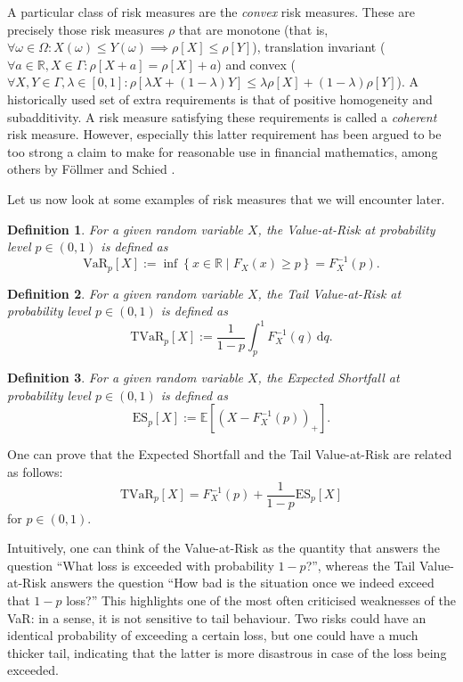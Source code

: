 \documentclass{article}
\newtheorem{definition}{Definition}
\begin{document}
A particular class of risk measures are the \textit{convex} risk measures. These are precisely those risk measures $\rho$ that are monotone (that is, $\forall \omega \in \Omega: X(\omega) \leq Y(\omega) \implies \rho[X] \leq \rho[Y]$), translation invariant ($\forall a \in \mathbb{R}, X \in \Gamma: \rho[X + a] = \rho[X] + a$) and convex ($\forall X, Y \in \Gamma, \lambda \in [0, 1]: \rho[\lambda X + (1-\lambda) Y] \leq \lambda \rho[X] + (1-\lambda)\rho[Y]$). A historically used set of extra requirements is that of positive homogeneity and subadditivity. A risk measure satisfying these requirements is called a \textit{coherent} risk measure. However, especially this latter requirement has been argued to be too strong a claim to make for reasonable use in financial mathematics, among others by Föllmer and Schied \cite{Follmer2002}. 

Let us now look at some examples of risk measures that we will encounter later.
\\
\begin{definition}\cite[Definition 6.3.1]{Risk_Measurement}
    For a given random variable $X$, the \textit{Value-at-Risk} at probability level $p \in (0, 1)$ is defined as $$\text{VaR}_p[X] := \inf \left\{x \in \mathbb{R} \mid F_X(x) \geq p \right\} = F_X^{-1} (p).$$
\end{definition}

\begin{definition}\cite[Definition 6.3.2]{Risk_Measurement}
    For a given random variable $X$, the \textit{Tail Value-at-Risk} at probability level $p \in (0, 1)$ is defined as $$\text{TVaR}_p[X] := \frac{1}{1 - p} \int_p^1  F_X^{-1} (q) \, \textrm{d}q.$$
\end{definition}

\begin{definition}\cite[Definition 6.3.4]{Risk_Measurement}
    For a given random variable $X$, the \textit{Expected Shortfall} at probability level $p \in (0, 1)$ is defined as $$\text{ES}_p[X] := \mathbb{E} \! \left[(X - F_X^{-1}(p))_+\right].$$
\end{definition}

One can prove that the Expected Shortfall and the Tail Value-at-Risk are related as follows:
$$\text{TVaR}_p[X] = F_X^{-1}(p) + \frac{1}{1-p}\text{ES}_p[X]$$
for $p\in (0,1)$.

Intuitively, one can think of the Value-at-Risk as the quantity that answers the question ``What loss is exceeded with probability $1 - p$?'', whereas the Tail Value-at-Risk answers the question ``How bad is the situation once we indeed exceed that $1-p$ loss?'' This highlights one of the most often criticised weaknesses of the VaR: in a sense, it is not sensitive to tail behaviour. Two risks could have an identical probability of exceeding a certain loss, but one could have a much thicker tail, indicating that the latter is more disastrous in case of the loss being exceeded. 
\end{document}
